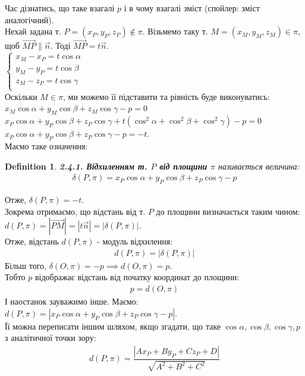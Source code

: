 \documentclass[a4paper, 10pt]{extarticle}
\theoremstyle{theoremdd}
\theoremstyle{theoremdd}
\newtheorem{definition}[theorem]{Definition}
\theoremstyle{theoremdd}
\theoremstyle{theoremdd}
\theoremstyle{theoremdd}
\theoremstyle{theoremdd}
\theoremstyle{theoremdd}
\theoremstyle{theoremdd}
\begin{document}
Час дізнатись, що таке взагалі $p$ і в чому взагалі зміст (спойлер: зміст аналогічний).\\
Нехай задана т. $P = (x_P, y_P, z_P) \not \in \pi$. Візьмемо таку т. $M = (x_M, y_M, z_M) \in \pi$, щоб $\overrightarrow{MP} \parallel \vec{n}$. Тоді $\overrightarrow{MP} = t \vec{n}$.\\
$\begin{cases}
x_M - x_P = t \cos \alpha\\
y_M - y_P = t \cos \beta\\
z_M - z_P = t \cos \gamma\\
\end{cases}
$\\
Оскільки $M \in \pi$, ми можемо її підставити та рівність буде виконуватись:\\
$x_M \cos \alpha + y_M \cos \beta + z_M \cos \gamma - p = 0$\\
$x_P \cos \alpha + y_P \cos \beta + z_P \cos \gamma + t(\cos^2 \alpha + \cos^2 \beta + \cos^2 \gamma) - p = 0$\\
$x_P \cos \alpha + y_P \cos \beta + z_P \cos \gamma -p = -t$.\\
Маємо таке означення:
\begin{definition}
\textbf{2.4.1. Відхиленням т. $P$ від площини $\pi$} називається величина:
\begin{align*}
\delta(P,\pi) = x_P \cos \alpha + y_P \cos \beta + z_P \cos \gamma - p
\end{align*}
\end{definition}
Отже, $\delta(P,\pi)=-t$.\\
Зокрема отримаємо, що відстань від т. $P$ до площини визначається таким чином:\\
$d(P,\pi)=|\overrightarrow{PM}| = |t \vec{n}| = |\delta(P,\pi)|$.\\
Отже, відстань $d(P,\pi)$ - модуль відхилення:
\begin{align*}
d(P,\pi) = |\delta(P,\pi)|
\end{align*}
Більш того, $\delta(O,\pi) = -p \implies d(O,\pi) = p$.\\
Тобто $p$ відображає відстань від початку координат до площини:
\begin{align*}
p = d(O,\pi)
\end{align*}
І наостанок зауважимо інше. Маємо:\\
$d(P,\pi) = |x_P \cos \alpha + y_P \cos \beta + z_P \cos \gamma - p|$.\\
Її можна переписати іншим шляхом, якщо згадати, що таке $\cos \alpha, \cos \beta, \cos \gamma, p$ з аналітичної точки зору:
\begin{align*}
d(P,\pi) = \dfrac{|Ax_P + By_P + Cz_P + D|}{\sqrt{A^2+B^2+C^2}}
\end{align*}
\end{document}

